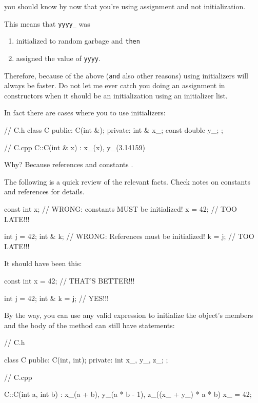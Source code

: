 you should know by now that you're using assignment and not
initialization.

This means that \texttt{yyyy\_} was

\begin{enumerate}
\item initialized to random garbage and \texttt{then}
\item assigned the value of \texttt{yyyy}.
\end{enumerate}

Therefore, because of the above (\texttt{and} also other reasons) using
initializers will always be faster. Do not let me ever catch you doing
an assignment in constructors when it should be an initialization using
an initializer list.

In fact there are cases where you  to use initializers:

\begin{consolethree}[escapeinside=||]
// C.h
class C
{
public:
    C(int &);
private:
    int & x_;
    const double y_;
};
\end{consolethree}

\begin{consolethree}[escapeinside=||]
// C.cpp
C::C(int & x)
    : x_(x), y_(3.14159)
{}
\end{consolethree}

Why? Because references and constants .

The following is a quick review of the relevant facts. Check notes on
constants and references for details.

\begin{consolethree}[escapeinside=||]
const int x; // WRONG: constants MUST be initialized!
x = 42;      // TOO LATE!!!

int j = 42;
int & k;     // WRONG: References must be initialized!
k = j;       // TOO LATE!!!
\end{consolethree}

It should have been this:

\begin{consolethree}[escapeinside=||]
const int x = 42; // THAT'S BETTER!!!

int j = 42;
int & k = j;      // YES!!!
\end{consolethree}

By the way, you can use any valid expression to initialize the object's
members and the body of the method can still have statements:

\begin{consolethree}[escapeinside=||]
// C.h

class C
{
public:
    C(int, int);
private:
    int x_, y_, z_;
};
\end{consolethree}

\begin{consolethree}[escapeinside=||]
// C.cpp

C::C(int a, int b)
    : x_(a + b), y_(a * b - 1), z_((x_ + y_) * a * b)
{
    x_ = 42;
}
\end{consolethree}




